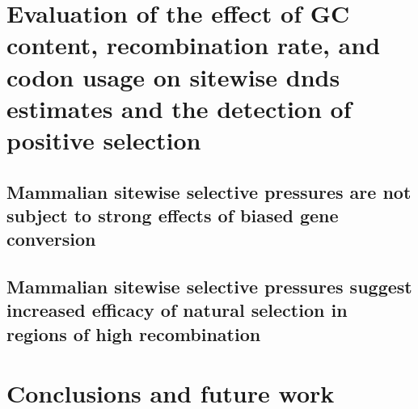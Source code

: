 \section{Evaluation of the effect of GC content, recombination rate, and codon usage on sitewise dnds estimates and the detection of positive selection}

\subsection{Mammalian sitewise selective pressures are not subject to strong effects of biased gene conversion}

\subsection{Mammalian sitewise selective pressures suggest increased efficacy of natural selection in regions of high recombination}

\section{Conclusions and future work}
